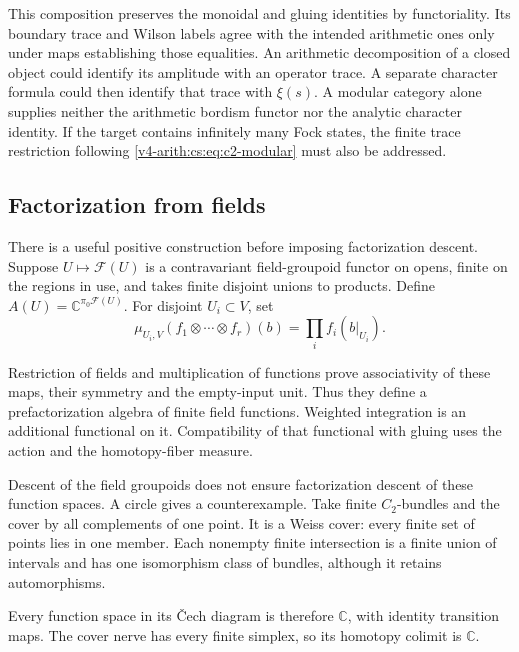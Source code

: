 This composition preserves the monoidal and gluing identities by
functoriality. Its boundary trace and Wilson labels agree with the intended
arithmetic ones only under maps establishing those equalities. An arithmetic
decomposition of a closed object could identify its amplitude with an
operator trace. A separate character formula could then identify that trace
with \(\xi(s)\). A modular category alone supplies neither the arithmetic
bordism functor nor the analytic character identity. If the target contains
infinitely many Fock states, the finite trace restriction following
\eqref{v4-arith:cs:eq:c2-modular} must also be addressed.

\subsection{Factorization from fields}

There is a useful positive construction before imposing factorization
descent. Suppose \(U\mapsto\mathcal F(U)\) is a contravariant field-groupoid
functor on opens, finite on the regions in use, and takes finite disjoint
unions to products. Define \(A(U)=\mathbb C^{\pi_0\mathcal F(U)}\). For
disjoint \(U_i\subset V\), set
\begin{equation}
 \mu_{U_i,V}(f_1\otimes\cdots\otimes f_r)(b)
             =\prod_i f_i(b|_{U_i}).
 \label{v4-arith:cs:eq:field-prefactorization}
\end{equation}

Restriction of fields and multiplication of functions prove associativity of
these maps, their symmetry and the empty-input unit. Thus they define a
prefactorization algebra of finite field functions. Weighted integration is
an additional functional on it. Compatibility of that functional with gluing
uses the action and the homotopy-fiber measure.

Descent of the field groupoids does not ensure factorization descent of
these function spaces. A circle gives a counterexample. Take finite
\(C_2\)-bundles and the cover by all complements of one point. It is a Weiss
cover: every finite set of points lies in one member. Each nonempty finite
intersection is a finite union of intervals and has one isomorphism class of
bundles, although it retains automorphisms.

Every function space in its \v{C}ech diagram is therefore \(\mathbb C\),
with identity transition maps. The cover nerve has every finite simplex, so
its homotopy colimit is \(\mathbb C\).

